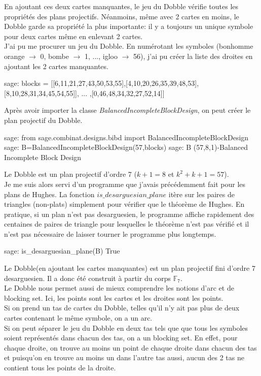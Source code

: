 \documentclass[a4paper]{article}
\begin{document}
En ajoutant ces deux cartes manquantes, le jeu du Dobble vérifie toutes les propriétés des plans projectifs. Néanmoins, même avec 2 cartes en moins, le Dobble garde sa propriété la plus importante: il y a toujours un unique symbole pour deux cartes même en enlevant 2 cartes.\vspace{1\baselineskip}\\
J'ai pu me procurer un jeu du Dobble. En numérotant les symboles (bonhomme orange $\rightarrow$ 0, bombe $\rightarrow$ 1, ..., igloo $\rightarrow$ 56), j'ai pu créer la liste des droites en ajoutant les 2 cartes manquantes.
\begin{sageverbatim}
  sage: blocks = [[6,11,21,27,43,50,53,55],[4,10,20,26,35,39,48,53],
        [8,10,28,31,34,45,54,55]], ... ,[0,46,48,34,32,27,52,14]]
\end{sageverbatim}
Après avoir importer la classe \textit{BalancedIncompleteBlockDesign}, on peut créer le plan projectif du Dobble.
\begin{sageverbatim}
 sage: from sage.combinat.designs.bibd import BalancedIncompleteBlockDesign
 sage: B=BalancedIncompleteBlockDesign(57,blocks)
 sage: B
 (57,8,1)-Balanced Incomplete Block Design
\end{sageverbatim}
Le Dobble est un plan projectif d'ordre 7 ($k+1=8$ et $k^2+k+1=57$).\\
\newpage
Je me suis alors servi d'un programme que j'avais précédemment fait pour les plans de Hughes. La fonction $is\_desarguesian\_plane$ itère sur les paires de triangles (non-plats) simplement pour vérifier que le théorème de Hughes. En pratique, si un plan n'est pas desarguesien, le programme affiche rapidement des centaines de paires de triangle pour lesquelles le théorème n'est pas vérifié et il n'est pas nécessaire de laisser tourner le programme plus longtemps.
\begin{sageverbatim}
 sage: is_desarguesian_plane(B)
 True
\end{sageverbatim}
Le Dobble(en ajoutant les cartes manquantes) est un plan projectif fini d'ordre 7 desarguesien. Il a donc été construit à partir du corps $\mathbb{F}_7$.
\vspace{2\baselineskip}\\
Le Dobble nous permet aussi de mieux comprendre les notions d'arc et de blocking set. Ici, les points sont les cartes et les droites sont les points.\vspace{2\baselineskip}\\
Si on prend un tas de cartes du Dobble, telles qu'il n'y ait pas plus de deux cartes contenant le même symbole, on a un arc. \\
Si on peut séparer le jeu du Dobble en deux tas tels que que tous les symboles soient représentés dans chacun des tas, on a un blocking set. En effet, pour chaque droite, on trouve au moins un point de chaque droite dans chacun des tas et puisqu'on en trouve au moins un dans l'autre tas aussi, aucun des 2 tas ne contient tous les points de la droite.
\newpage
\end{document}
